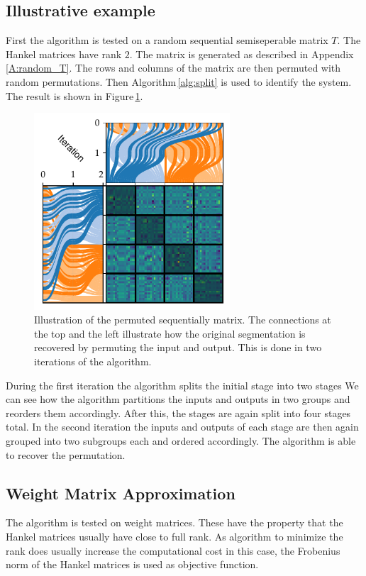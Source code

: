 \documentclass[doctype=mastersthesis,BCOR=15mm,biblatex]{ldvbook}%
\begin{document}
\subsection{Illustrative example}
First the algorithm is tested on a random sequential semiseperable matrix $T$.
The Hankel matrices have rank $2$.
The matrix is generated as described in Appendix\,\ref{A:random_T}. 
The rows and columns of the matrix are then permuted with random permutations.
Then Algorithm\,\ref{alg:split} is used to identify the system.
The result is shown in Figure\,\ref{fig:example_permute}.
\begin{figure}[!htb]
	\centering
	\includegraphics[width=0.65\textwidth]{Plots/example_permute.pdf}
	\caption{Illustration of the permuted sequentially matrix.
		The connections at the top and the left illustrate how the original segmentation is recovered by permuting the input and output.
		This is done in two iterations of the algorithm.
	}
	\label{fig:example_permute}
\end{figure}
During the first iteration the algorithm splits the initial stage into two stages
We can see how the algorithm partitions the inputs and outputs in two groups and reorders them accordingly.
After this, the stages are again split into four stages total.
In the second iteration the inputs and outputs of each stage are then again grouped into two subgroups each and ordered accordingly.
The algorithm is able to recover the permutation.

\subsection{Weight Matrix Approximation}
The algorithm is tested on weight matrices.
These have the property that the Hankel matrices usually have close to full rank. 
As algorithm to minimize the rank does usually increase the computational cost in this case, the Frobenius norm of the Hankel matrices is used as objective function.
\end{document}
